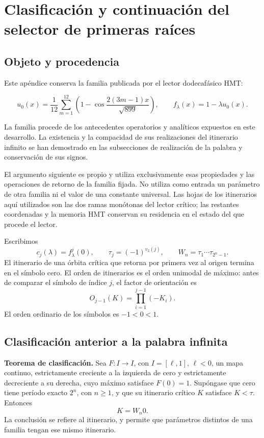 \section{Clasificación y continuación del selector de primeras raíces}
\label{hmtfg:fragmento:clasificacion-y-continuacion-del-selector-de-primeras-raices}

\subsection{Objeto y procedencia}
\label{hmtfg:clasificacion:1}

Este apéndice conserva la familia publicada por el lector dodecafásico HMT:

\[
u_0(x)=\frac1{12}\sum_{m=1}^{12}\left(1-\cos\frac{2(3m-1)x}{\sqrt{899}}\right),
\qquad f_\lambda(x)=1-\lambda u_0(x).
\]

La familia procede de los antecedentes operatorios y analíticos expuestos en este desarrollo. La existencia y la compacidad de sus realizaciones del itinerario infinito se han demostrado en las subsecciones de realización de la palabra y conservación de sus signos.

El argumento siguiente es propio y utiliza exclusivamente esas propiedades y las operaciones de retorno de la familia fijada. No utiliza como entrada un parámetro de otra familia ni el valor de una constante universal. Las hojas de los itinerarios aquí utilizados son las dos ramas monótonas del lector crítico; las restantes coordenadas y la memoria HMT conservan su residencia en el estado del que procede el lector.

Escribimos
\[
c_j(\lambda)=f_\lambda^j(0),\qquad
\tau_j=(-1)^{v_2(j)},\qquad
W_n=\tau_1\cdots\tau_{2^n-1}.
\]
El itinerario de una órbita crítica que retorna por primera vez al origen termina en el símbolo cero. El orden de itinerarios es el orden unimodal de máximo: antes de comparar el símbolo de índice \(j\), el factor de orientación es
\[
O_{j-1}(K)=\prod_{i=1}^{j-1}(-K_i).
\]
El orden ordinario de los símbolos es \(-1<0<1\).


\subsection{Clasificación anterior a la palabra infinita}
\label{hmtfg:clasificacion:2}

\textbf{Teorema de clasificación.} Sea \(F:I\to I\), con \(I=[\ell,1]\), \(\ell<0\), un mapa continuo, estrictamente creciente a la izquierda de cero y estrictamente decreciente a su derecha, cuyo máximo satisface \(F(0)=1\). Supóngase que cero tiene período exacto \(2^n\), con \(n\ge1\), y que su itinerario crítico \(K\) satisface \(K<\tau\). Entonces
\[
\boxed{K=W_n0.}
\]
La conclusión se refiere al itinerario, y permite que parámetros distintos de una familia tengan ese mismo itinerario.

